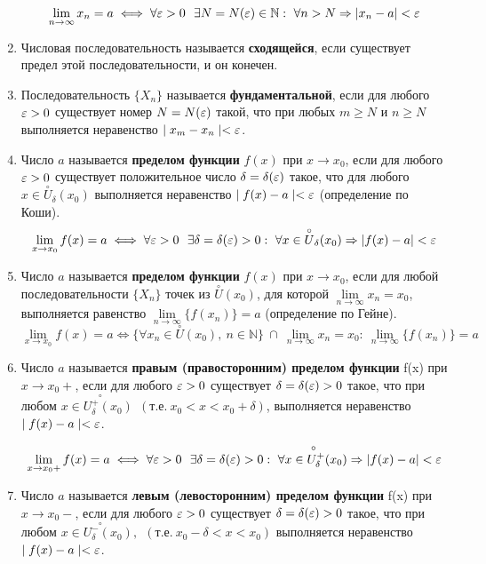 \begin{enumerate}
$$\lim\limits_{n \to \infty}x_n = a \iff \forall {\large\varepsilon}>0 \ \ \exists N = N({\large\varepsilon}) \in \mathbb{N}: \ \forall n > N \Rightarrow | x_n - a|  < {\large\varepsilon}$$
\item Числовая последовательность называется \textbf{сходящейся}, если существует предел этой последовательности, и он конечен.
\item Последовательность $\{X_n\}$ называется \textbf{фундаментальной}, если для любого ${\large\varepsilon} > 0$ существует номер $N = N({\large\varepsilon})$ такой, что при любых $m \geqslant N$ и $n \geqslant N$ выполняется неравенство $\mid  x_m - x_n\mid   < {\large\varepsilon}$.
\item Число $a$ называется \textbf{пределом функции} $f(x)$ при $x \rightarrow x_0$, если для любого ${\large\varepsilon} > 0$ существует положительное число $\delta = \delta ({\large\varepsilon})$ такое, что для любого $x \in \overset{\circ}U_\delta(x_0)$ выполняется неравенство $\mid  f(x) - a\mid   < {\large\varepsilon}$ (определение по Коши). $$\lim\limits_{x \to x_0} f(x) = a \iff \forall{\large\varepsilon} > 0 \ \ \exists \delta = \delta({\large\varepsilon}) > 0 : \ \forall x \in \overset{\circ}U_\delta(x_0) \Rightarrow | f(x) - a|  < {\large\varepsilon}$$
\item Число $a$ называется \textbf{пределом функции} $f(x)$ при $x \rightarrow x_0$, если для любой последовательности $\{X_n\}$ точек из $\overset{\circ}U(x_0)$, для которой $\lim\limits_{n \to \infty}x_n = x_0$, выполняется равенство $\lim\limits_{n \to \infty}\{f(x_n)\} = a$ (определение по Гейне). $$\lim\limits_{x \to x_0}f(x) = a \iff \{\forall x_n \in \overset{\circ}U(x_0), \ n \in \mathbb{N}\} \ \cap \ \lim\limits_{n \to \infty}{x_n} = x_0 : \ 
    \lim\limits_{n \to \infty}\{f(x_n)\} = a$$
\item Число $a$ называется \textbf{правым (правосторонним) пределом функции} f(x) при $x \rightarrow x_0 +$, если для любого ${\large\varepsilon} > 0$ существует $\delta = \delta({\large\varepsilon}) > 0$ такое, что при любом $x \in {\overset{\circ\hspace{22pt}}{U^+_\delta(x_0)}} \ \ (т.е. \ x_0 < x < x_0 + \delta)$, выполняется неравенство $\mid  f(x) - a\mid   < {\large\varepsilon}$.

$$\lim\limits_{x \to x_0 +} f(x) = a \iff \forall{\large\varepsilon} > 0 \ \ \exists \delta = \delta({\large\varepsilon}) > 0 : \ \forall x \in {\overset{\circ\hspace{22pt}}{U^+_\delta(x_0)}}  \Rightarrow | f(x) - a|  < {\large\varepsilon}$$
\item Число $a$ называется \textbf{левым (левосторонним) пределом функции} f(x) при $x \rightarrow x_0 -$, если для любого ${\large\varepsilon} > 0$ существует $\delta = \delta({\large\varepsilon}) > 0$ такое, что при любом $x \in {\overset{\circ\hspace{22pt}}{U^-_\delta(x_0)}}, \ \ (т.е. \ x_0 - \delta < x < x_0)$ выполняется неравенство $\mid  f(x) - a\mid   < {\large\varepsilon}$.


\end{enumerate}
